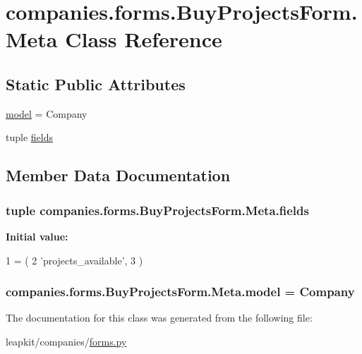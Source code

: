 \hypertarget{classcompanies_1_1forms_1_1_buy_projects_form_1_1_meta}{\section{companies.\-forms.\-Buy\-Projects\-Form.\-Meta Class Reference}
\label{classcompanies_1_1forms_1_1_buy_projects_form_1_1_meta}
}
\subsection*{Static Public Attributes}
\begin{DoxyCompactItemize}
\item 
\hyperlink{classcompanies_1_1forms_1_1_buy_projects_form_1_1_meta_aa54175f1515f124cd1b53b9b80508b3d}{model} = Company
\item 
tuple \hyperlink{classcompanies_1_1forms_1_1_buy_projects_form_1_1_meta_a7c2dd440866c3a89e04feaab3ddaa287}{fields}
\end{DoxyCompactItemize}


\subsection{Member Data Documentation}
\hypertarget{classcompanies_1_1forms_1_1_buy_projects_form_1_1_meta_a7c2dd440866c3a89e04feaab3ddaa287}{
\subsubsection[{fields}]{\setlength{\rightskip}{0pt plus 5cm}tuple companies.\-forms.\-Buy\-Projects\-Form.\-Meta.\-fields\hspace{0.3cm}{\ttfamily [static]}}}\label{classcompanies_1_1forms_1_1_buy_projects_form_1_1_meta_a7c2dd440866c3a89e04feaab3ddaa287}
{\bfseries Initial value\-:}
\begin{DoxyCode}
1 = (
2             \textcolor{stringliteral}{'projects\_available'},
3         )
\end{DoxyCode}
\hypertarget{classcompanies_1_1forms_1_1_buy_projects_form_1_1_meta_aa54175f1515f124cd1b53b9b80508b3d}{
\subsubsection[{model}]{\setlength{\rightskip}{0pt plus 5cm}companies.\-forms.\-Buy\-Projects\-Form.\-Meta.\-model = Company\hspace{0.3cm}{\ttfamily [static]}}}\label{classcompanies_1_1forms_1_1_buy_projects_form_1_1_meta_aa54175f1515f124cd1b53b9b80508b3d}


The documentation for this class was generated from the following file\-:\begin{DoxyCompactItemize}
\item 
leapkit/companies/\hyperlink{companies_2forms_8py}{forms.\-py}\end{DoxyCompactItemize}
